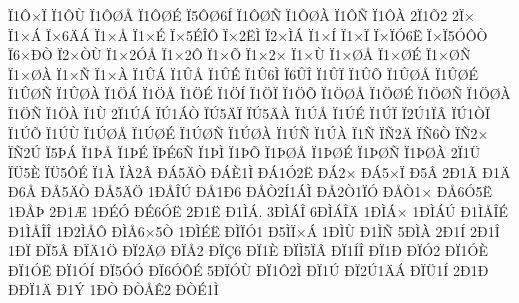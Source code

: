 {^^cf1^^d4^^d7^^cf
^^cf1^^d4^^d9
^^cf1^^d4^^d8^^c5
^^cf1^^d4^^d8^^c9
^^cf5^^d4^^d86^^cd
^^cf1^^d4^^d8^^d1
^^cf1^^d4^^d8^^c0
^^cf1^^d4^^d1
^^cf1^^d4^^c0
2^^cf1^^d52
2^^cf^^d7
^^cf1^^d7^^c1
^^cf^^d76^^c4^^c1
^^cf1^^d7^^c5
^^cf1^^d7^^c9
^^cf^^d75^^c9^^ce^^d4
^^cf^^d72^^cb^^cc
^^cf2^^d7^^cc^^c1
^^cf1^^d7^^cd
^^cf1^^d7^^cf
^^cf^^d7^^cf^^d36^^cb
^^cf^^d7^^cf5^^d3^^d4^^d2
^^cf6^^d7^^d0^^d2
^^cf2^^d7^^d2^^d9
^^cf1^^d72^^d3^^c5
^^cf1^^d72^^d4
^^cf1^^d7^^d5
^^cf1^^d72^^d7
^^cf1^^d7^^d9
^^cf1^^d7^^d8^^c5
^^cf1^^d7^^d8^^c9
^^cf1^^d7^^d8^^d1
^^cf1^^d7^^d8^^c0
^^cf1^^d7^^d1
^^cf1^^d7^^c0
^^cf1^^db^^c1
^^cf1^^db^^c5
^^cf1^^db^^c9
^^cf1^^db6^^cc
^^cf6^^db^^ce
^^cf1^^db^^cf
^^cf1^^db^^d5
^^cf1^^db^^d8^^c5
^^cf1^^db^^d8^^c9
^^cf1^^db^^d8^^d1
^^cf1^^db^^d8^^c0
^^cf1^^d6^^c1
^^cf1^^d6^^c5
^^cf1^^d6^^c9
^^cf1^^d6^^cd
^^cf1^^d6^^cf
^^cf1^^d6^^d5
^^cf1^^d6^^d8^^c5
^^cf1^^d6^^d8^^c9
^^cf1^^d6^^d8^^d1
^^cf1^^d6^^d8^^c0
^^cf1^^d6^^d1
^^cf1^^d6^^c0
^^cf1^^d9
2^^cf1^^da^^c1
^^cf^^da1^^c1^^d2
^^cf^^da5^^c4^^cf
^^cf^^da5^^c4^^c0
^^cf1^^da^^c5
^^cf1^^da^^c9
^^cf1^^da^^cf
^^cf2^^da1^^cf^^c2
^^cf^^da1^^d2^^cf
^^cf1^^da^^d5
^^cf1^^da^^d9
^^cf1^^da^^d8^^c5
^^cf1^^da^^d8^^c9
^^cf1^^da^^d8^^d1
^^cf1^^da^^d8^^c0
^^cf1^^da^^d1
^^cf1^^da^^c0
^^cf1^^d1
^^cf^^d12^^c4
^^cf^^d16^^d2
^^cf^^d12^^d7
^^cf^^d12^^da
^^cf5^^de^^c1
^^cf1^^de^^c5
^^cf1^^de^^c9
^^cf^^de^^c96^^d1
^^cf1^^de^^cc
^^cf1^^de^^d5
^^cf1^^de^^d8^^c5
^^cf1^^de^^d8^^c9
^^cf1^^de^^d8^^d1
^^cf1^^de^^d8^^c0
2^^cf1^^dc
^^cf^^dc5^^c8
^^cf^^dc5^^d4^^c9
^^cf1^^c0
^^cf^^c02^^c2
^^d0^^c15^^c4^^d2
^^d0^^c1^^c81^^cc
^^d0^^c11^^d32^^cb
^^d0^^c12^^d7
^^d0^^c15^^d7^^cf
^^d05^^c2
2^^d01^^c3
^^d01^^c4
^^d06^^c5
^^d0^^c55^^c4^^d2
^^d0^^c55^^c4^^d6
1^^d0^^c5^^ce^^da
^^d0^^c51^^d06
^^d0^^c5^^d22^^cd1^^c1^^cc
^^d0^^c52^^d21^^cf^^d3
^^d0^^c5^^d21^^d7
^^d0^^c56^^d35^^cb
1^^d0^^c5^^de
2^^d01^^c6
1^^d0^^c9^^d3
^^d0^^c96^^d3^^cb
2^^d01^^cb
^^d01^^cc^^c1.
3^^d0^^cc^^c1^^ce
6^^d0^^cc^^c1^^ce^^c4
1^^d0^^cc^^c1^^d7
1^^d0^^cc^^c1^^da
^^d01^^cc^^c5^^ce^^c9
^^d01^^cc^^c5^^ce^^ce
1^^d02^^cc^^c5^^d4
^^d0^^cc^^c56^^d75^^d2
1^^d0^^cc^^c9^^cb
^^d0^^cc^^cf^^d31
^^d05^^cc^^cf^^d7^^c1
1^^d0^^cc^^d9
^^d01^^cc^^d1
5^^d0^^cc^^c0
2^^d01^^cd
2^^d01^^ce
1^^d0^^cf
^^d0^^cf5^^c2
^^d0^^cf^^c41^^d6
^^d0^^cf2^^c4^^d8
^^d0^^cf^^c52
^^d0^^cf^^c76
^^d0^^cf1^^c8
^^d0^^cf^^cc5^^cf^^c2
^^d0^^cf1^^cd^^ce
^^d0^^cf1^^d0
^^d0^^cf^^d32
^^d0^^cf1^^d3^^c8
^^d0^^cf1^^d3^^cb
^^d0^^cf1^^d3^^cd
^^d0^^cf5^^d3^^d3
^^d0^^cf6^^d3^^d4^^c9
5^^d0^^cf^^d3^^d9
^^d0^^cf1^^d42^^cc
^^d0^^cf1^^da
^^d0^^cf2^^da1^^c4^^c1
^^d0^^cf^^dc1^^cd
2^^d01^^d0
^^d0^^d0^^cf1^^c4
^^d01^^dd
1^^d0^^d2
^^d0^^d2^^c5^^ca2
^^d0^^d2^^c91^^cc
}
